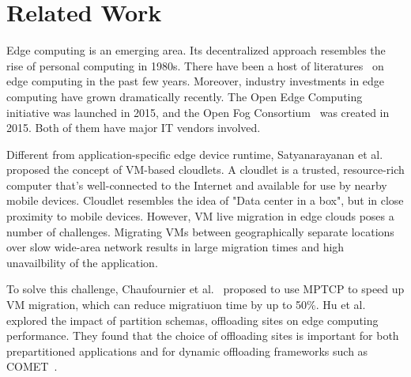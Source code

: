 \section{Related Work}
\label{sec:related}

Edge computing is an emerging area. Its decentralized approach resembles
the rise of personal computing in 1980s.
There have been a host of literatures~\cite{edge-computing,edgecloudsim,cloudlets09,Cloudlets12,hu-apsys16,ChaufournierSLN17}
on edge computing in the past few years.
Moreover, industry investments in edge computing have grown dramatically recently.
The Open Edge Computing\cite{url:openedgecomputing} initiative was launched in 2015,
and the Open Fog Consortium~\cite{url:openfog} was created in 2015. Both of them have major IT vendors involved.

Different from application-specific edge device runtime,
Satyanarayanan et al.~\cite{cloudlets09} proposed the concept of VM-based cloudlets. A cloudlet is a trusted,
resource-rich computer that's well-connected to the Internet and available for use by nearby mobile devices.
Cloudlet resembles the idea of "Data center in a box", but in close proximity to mobile devices.
However, VM live migration in edge clouds poses a number of challenges. Migrating VMs between geographically
separate locations over slow wide-area network results in large migration times and high unavailbility of the application.

To solve this challenge, Chaufournier et al.~\cite{ChaufournierSLN17} proposed to use MPTCP to speed up VM migration, which can reduce
migratiuon time by up to 50\%.
Hu et al.~\cite{hu-apsys16} explored the impact of partition schemas, offloading sites on edge computing performance.
They found that the choice of offloading sites is important for both prepartitioned applications and
for dynamic offloading frameworks such as COMET~\cite{COMET}.
